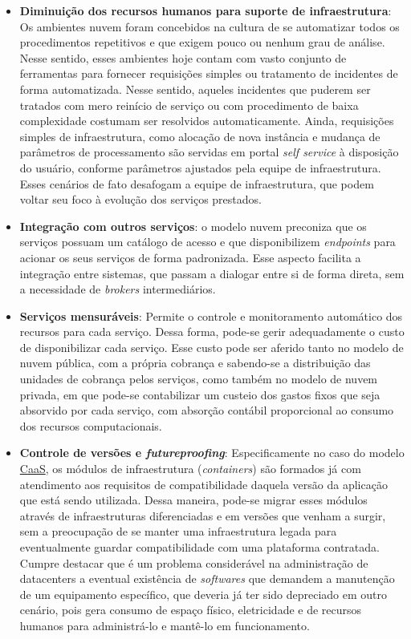 \begin{itemize}
        \item \textbf{Diminuição dos recursos humanos para suporte de infraestrutura}: Os ambientes nuvem foram concebidos na cultura de se automatizar todos os procedimentos repetitivos e que exigem pouco ou nenhum grau de análise. Nesse sentido, esses ambientes hoje contam com vasto conjunto de ferramentas para fornecer requisições simples ou tratamento de incidentes de forma automatizada. Nesse sentido, aqueles incidentes que puderem ser tratados com mero reinício de serviço ou com procedimento de baixa complexidade costumam ser resolvidos automaticamente. Ainda, requisições simples de infraestrutura, como alocação de nova instância e mudança de parâmetros de processamento são servidas em portal \emph{self service} à disposição do usuário, conforme parâmetros ajustados pela equipe de infraestrutura. Esses cenários de fato desafogam a equipe de infraestrutura, que podem voltar seu foco à evolução dos serviços prestados.
        
        \item \textbf{Integração com outros serviços}: o modelo nuvem preconiza que os serviços possuam um catálogo de acesso e que disponibilizem \emph{endpoints} para acionar os seus serviços de forma padronizada. Esse aspecto facilita a integração entre sistemas, que passam a dialogar entre si de forma direta, sem a necessidade de \emph{brokers} intermediários.

        \item \textbf{Serviços mensuráveis}: Permite o controle e monitoramento automático dos recursos para cada serviço. Dessa forma, pode-se gerir adequadamente o custo de disponibilizar cada serviço. Esse custo pode ser aferido tanto no modelo de nuvem pública, com a própria cobrança e sabendo-se a distribuição das unidades de cobrança pelos serviços, como também no modelo de nuvem privada, em que pode-se contabilizar um custeio dos gastos fixos que seja absorvido por cada serviço, com absorção contábil proporcional ao consumo dos recursos computacionais.
        
        \item \textbf{Controle de versões e \emph{futureproofing}}: Especificamente no caso do modelo \hyperref[caas]{CaaS}, os módulos de infraestrutura (\emph{containers}) são formados já com atendimento aos requisitos de compatibilidade daquela versão da aplicação que está sendo utilizada. Dessa maneira, pode-se migrar esses módulos através de infraestruturas diferenciadas e em versões que venham a surgir, sem a preocupação de se manter uma infraestrutura legada para eventualmente guardar compatibilidade com uma plataforma contratada. Cumpre destacar que é um problema considerável na administração de datacenters a eventual existência de \emph{softwares} que demandem a manutenção de um equipamento específico, que deveria já ter sido depreciado em outro cenário, pois gera consumo de espaço físico, eletricidade e de recursos humanos para administrá-lo e mantê-lo em funcionamento.
    \end{itemize}
    
